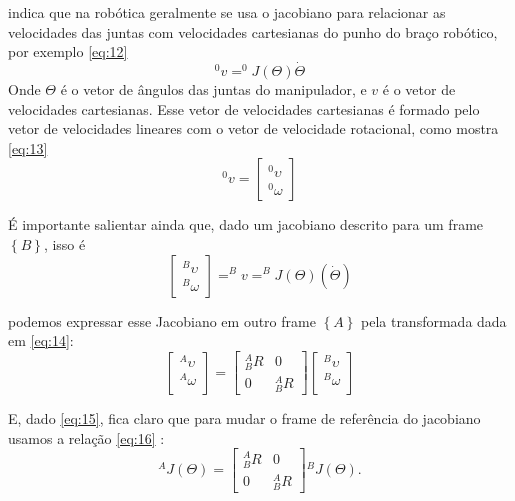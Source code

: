  indica que na robótica geralmente se usa o jacobiano para relacionar as velocidades das juntas com velocidades cartesianas do punho do braço robótico, por exemplo \eqref{eq:12}
\begin{equation}
	^0v = ^0J(\Theta)\dot{\Theta}
	\label{eq:12}
\end{equation}
Onde $\Theta$ é o vetor de ângulos das juntas do manipulador, e $v$ é o vetor de velocidades cartesianas. Esse vetor de velocidades cartesianas é formado pelo vetor de velocidades lineares com o vetor de velocidade rotacional, como mostra \eqref{eq:13}
\begin{equation}
	\displaystyle ^0v = \begin{bmatrix}
		\displaystyle ^0 \upsilon \\
		\displaystyle ^0 \omega 
	\end{bmatrix}
	\label{eq:13}
\end{equation}

É importante salientar ainda que, dado um jacobiano descrito para um frame $\left \{ B \right \}$, isso é
\begin{equation}
	\begin{bmatrix}
		\displaystyle ^B \upsilon \\
		\displaystyle ^B \omega 
	\end{bmatrix} = ^B v = ^B J(\Theta)(\dot\Theta)
	\label{eq:15}
\end{equation}

podemos expressar esse Jacobiano em outro frame $\left \{ A \right \}$ pela transformada dada em \eqref{eq:14}:
\begin{equation}
	\begin{bmatrix}
		\displaystyle ^A \upsilon \\
		\displaystyle ^A \omega \\
	\end{bmatrix} = \begin{bmatrix}
		^A_BR  &  0\\ 
		0 &  ^A_BR
		\end{bmatrix} \begin{bmatrix}
		\displaystyle ^B \upsilon \\
		\displaystyle ^B \omega \\
	\end{bmatrix}
	\label{eq:14}
\end{equation}

E, dado \eqref{eq:15}, fica claro que para mudar o frame de referência do jacobiano usamos a relação \eqref{eq:16} \cite{Craig2005}:
\begin{equation}
	^A J(\Theta) = \begin{bmatrix}
		^A_BR  &  0\\ 
		0 &  ^A_BR
		\end{bmatrix} {^BJ(\Theta)}.
		\label{eq:16}
\end{equation}

